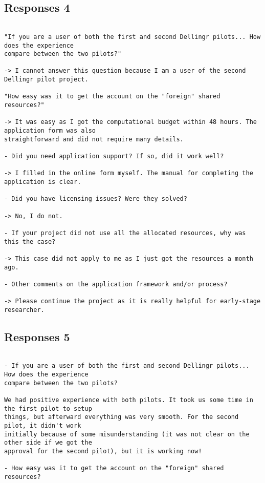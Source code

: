 {\subsection*{Responses 4}
\begin{verbatim}

"If you are a user of both the first and second Dellingr pilots... How does the experience
compare between the two pilots?"

-> I cannot answer this question because I am a user of the second Dellingr pilot project. 

"How easy was it to get the account on the "foreign" shared resources?"

-> It was easy as I got the computational budget within 48 hours. The application form was also
straightforward and did not require many details. 

- Did you need application support? If so, did it work well?

-> I filled in the online form myself. The manual for completing the application is clear. 

- Did you have licensing issues? Were they solved?

-> No, I do not. 

- If your project did not use all the allocated resources, why was this the case?

-> This case did not apply to me as I just got the resources a month ago. 

- Other comments on the application framework and/or process?

-> Please continue the project as it is really helpful for early-stage researcher. 
\end{verbatim}
\subsection*{Responses 5}
\begin{verbatim}

- If you are a user of both the first and second Dellingr pilots... How does the experience
compare between the two pilots?

We had positive experience with both pilots. It took us some time in the first pilot to setup
things, but afterward everything was very smooth. For the second pilot, it didn't work
initially because of some misunderstanding (it was not clear on the other side if we got the
approval for the second pilot), but it is working now!

- How easy was it to get the account on the "foreign" shared resources?


\end{verbatim}}
